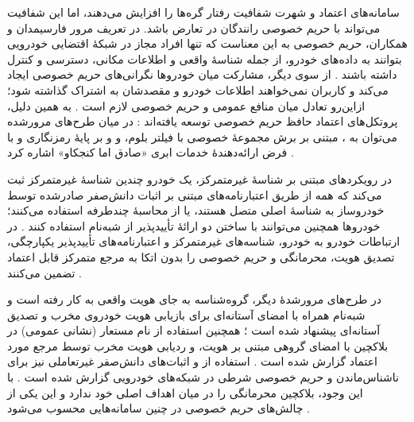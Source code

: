 سامانه‌های اعتماد و شهرت شفافیت رفتار گره‌ها را افزایش می‌دهند، اما این شفافیت می‌تواند با حریم خصوصی رانندگان در تعارض باشد. در تعریف مرور فارسیمدان و همکاران، حریم خصوصی به این معناست که تنها افراد مجاز در شبکهٔ اقتضایی خودرویی بتوانند به داده‌های خودرو، از جمله شناسهٔ واقعی و اطلاعات مکانی، دسترسی و کنترل داشته باشند \cite{farsimadanReviewSecurityChallenges2025}. از سوی دیگر، مشارکت میان خودروها نگرانی‌های حریم خصوصی ایجاد می‌کند \cite{farsimadanReviewSecurityChallenges2025} و کاربران نمی‌خواهند اطلاعات خودرو و مقصدشان به اشتراک گذاشته شود؛ ازاین‌رو تعادل میان منافع عمومی و حریم خصوصی لازم است \cite{hozouriOverviewVANETVehicular2023}. به همین دلیل، پروتکل‌های اعتماد حافظ حریم خصوصی توسعه یافته‌اند \cite{farsimadanReviewSecurityChallenges2025}: در میان طرح‌های مرورشده می‌توان به ،  مبتنی بر برش مجموعهٔ خصوصی با فیلتر بلوم، و  و  بر پایهٔ رمزنگاری  و  با فرض ارائه‌دهندهٔ خدمات ابری «صادق اما کنجکاو» اشاره کرد \cite{farsimadanReviewSecurityChallenges2025}.

در رویکردهای مبتنی بر شناسهٔ غیرمتمرکز، یک خودرو چندین شناسهٔ غیرمتمرکز ثبت می‌کند که همه از طریق اعتبارنامه‌های مبتنی بر اثبات دانش‌صفر صادرشده توسط خودروساز به شناسهٔ اصلی متصل هستند، یا از محاسبهٔ چندطرفه استفاده می‌کنند؛ خودروها همچنین می‌توانند با ساختن دو ارائهٔ تأییدپذیر از شبه‌نام استفاده کنند \cite{mazzocca2025survey}. در ارتباطات خودرو به خودرو، شناسه‌های غیرمتمرکز و اعتبارنامه‌های تأییدپذیر یکپارچگی، تصدیق هویت، محرمانگی و حریم خصوصی را بدون اتکا به مرجع متمرکز قابل اعتماد تضمین می‌کنند \cite{mazzocca2025survey}.

در طرح‌های مرورشدهٔ دیگر، گروه‌شناسه به جای هویت واقعی به کار رفته است \cite{farsimadanReviewSecurityChallenges2025} و شبه‌نام همراه با امضای آستانه‌ای برای بازیابی هویت خودروی مخرب و تصدیق آستانه‌ای پیشنهاد شده است \cite{farsimadanReviewSecurityChallenges2025}؛ همچنین استفاده از نام مستعار (نشانی عمومی) در بلاکچین با امضای گروهی مبتنی بر هویت، و ردیابی هویت مخرب توسط مرجع مورد اعتماد گزارش شده است \cite{razaBlockchainBasedReputationTrust2024}. استفاده از  و اثبات‌های دانش‌صفر غیرتعاملی نیز برای ناشناس‌ماندن و حریم خصوصی شرطی در شبکه‌های خودرویی گزارش شده است \cite{razaBlockchainBasedReputationTrust2024}. با این وجود، بلاکچین محرمانگی را در میان اهداف اصلی خود ندارد و این یکی از چالش‌های حریم خصوصی در چنین سامانه‌هایی محسوب می‌شود \cite{razaBlockchainBasedReputationTrust2024}.
